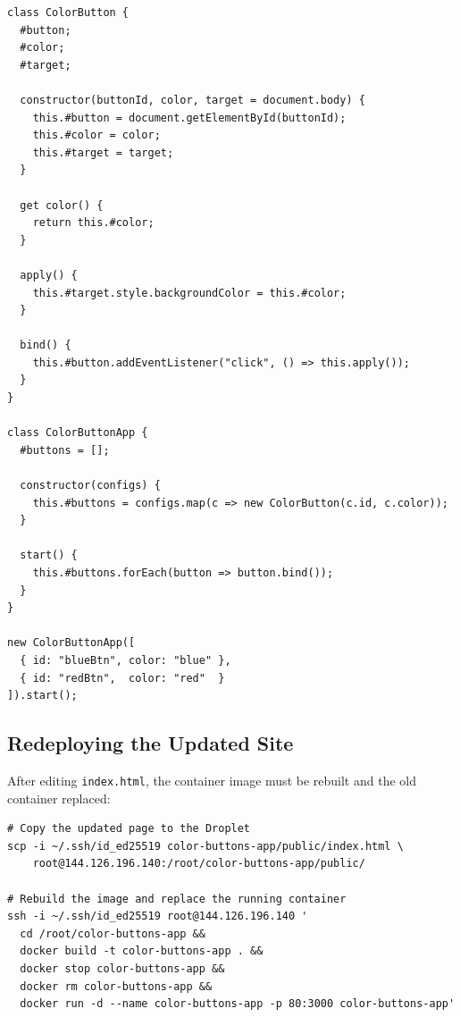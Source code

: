 \begin{listing}[H]
\begin{verbatim}
class ColorButton {
  #button;
  #color;
  #target;

  constructor(buttonId, color, target = document.body) {
    this.#button = document.getElementById(buttonId);
    this.#color = color;
    this.#target = target;
  }

  get color() {
    return this.#color;
  }

  apply() {
    this.#target.style.backgroundColor = this.#color;
  }

  bind() {
    this.#button.addEventListener("click", () => this.apply());
  }
}

class ColorButtonApp {
  #buttons = [];

  constructor(configs) {
    this.#buttons = configs.map(c => new ColorButton(c.id, c.color));
  }

  start() {
    this.#buttons.forEach(button => button.bind());
  }
}

new ColorButtonApp([
  { id: "blueBtn", color: "blue" },
  { id: "redBtn",  color: "red"  }
]).start();
\end{verbatim}
\caption{Class-based JavaScript in \texttt{public/index.html}.}
\end{listing}

\subsection{Redeploying the Updated Site}
After editing \texttt{index.html}, the container image must be rebuilt and the
old container replaced:

\begin{listing}[H]
\begin{verbatim}
# Copy the updated page to the Droplet
scp -i ~/.ssh/id_ed25519 color-buttons-app/public/index.html \
    root@144.126.196.140:/root/color-buttons-app/public/

# Rebuild the image and replace the running container
ssh -i ~/.ssh/id_ed25519 root@144.126.196.140 '
  cd /root/color-buttons-app &&
  docker build -t color-buttons-app . &&
  docker stop color-buttons-app &&
  docker rm color-buttons-app &&
  docker run -d --name color-buttons-app -p 80:3000 color-buttons-app'
\end{verbatim}
\caption{Redeploying after the class-based change.}
\end{listing}

